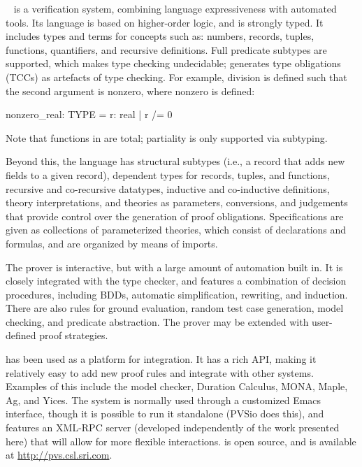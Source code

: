 \pvs~\cite{pvs} is a verification system,
combining language expressiveness with automated tools. Its language is
based on higher-order logic, and is strongly typed.  It includes
types and terms for concepts such as: numbers, records, tuples, functions,
quantifiers, and recursive definitions.  Full predicate subtypes are
supported, which makes type checking undecidable; \pvs generates type
obligations (TCCs) as artefacts of type checking.  For example, division is
defined such that the second argument is nonzero, where nonzero is defined:
\begin{code}
nonzero_real: TYPE = {r: real | r /= 0}
\end{code}
Note that functions in \pvs are total; partiality is only supported via subtyping.

Beyond this, the \pvs language has structural subtypes (i.e., a record that
adds new fields to a given record), dependent types for records, tuples, and
functions, recursive and co-recursive datatypes, inductive and co-inductive
definitions, theory interpretations, and theories as parameters,
conversions, and judgements that provide control over the generation of
proof obligations.  Specifications are given as collections of
parameterized theories, which consist of declarations and formulas, and
are organized by means of imports. \medskip

The \pvs prover is interactive, but with a large amount of automation built
in.  It is closely integrated with the type checker, and features a
combination of decision procedures, including BDDs, automatic simplification,
rewriting, and induction.  There are also rules for ground evaluation,
random test case generation, model checking, and predicate abstraction.
The prover may be extended with user-defined proof strategies.

\pvs has been used as a platform for integration.  It has a rich API, making it relatively
easy to add new proof rules and integrate with other systems.  Examples of this include
the model checker, Duration Calculus, MONA, Maple, Ag, and Yices.  The system is normally
used through a customized Emacs interface, though it is possible to run it standalone
(PVSio does this), and \pvs features an XML-RPC server (developed independently of
the work presented here) that will allow for more flexible interactions.  \pvs is open source, and is
available at \url{http://pvs.csl.sri.com}.\medskip

